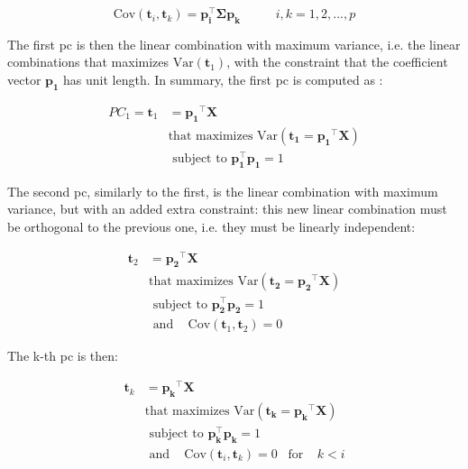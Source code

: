 \begin{equation}
	\label{eqn:pca-cov}
	\text{Cov}(\mathbf{t}_i, \mathbf{t}_k) = \mathbf{p_i^\intercal \Sigma p_k}\;\;\;\;\;\;\;\;\;\; i,k= 1, 2, ..., p
\end{equation}

The first \acrfull{pc} is then the linear combination with maximum variance, i.e. the linear combinations that maximizes $\text{Var}(\mathbf{t}_1)$, with the constraint that the coefficient vector $\mathbf{p_1}$ has unit length. In summary, the first \acrshort{pc} is computed as \parencite{johnson2013applied}:

\begin{equation}
	\label{eqn:pca-pc1}
	\begin{split}
		PC_1  = \mathbf{t}_1 & =\mathbf{p_1}^\intercal \mathbf{X}\\
			   & \text{that maximizes Var}(\mathbf{t_1}=\mathbf{p_1}^\intercal \mathbf{X}) \\
			   & \text{ subject to }  \mathbf{p_1^\intercal p_1} = 1
	\end{split}
\end{equation}

The second \acrshort{pc}, similarly to the first, is the linear combination with maximum variance, but with an added extra constraint: this new linear combination must be orthogonal to the previous one, i.e. they must be linearly independent:

\begin{equation}
	\label{eqn:pca-pc2}
	\begin{split}
		\mathbf{t}_2 & =\mathbf{p_2}^\intercal \mathbf{X}\\
		& \text{that maximizes Var}(\mathbf{t_2}=\mathbf{p_2}^\intercal \mathbf{X}) \\
		& \text{ subject to }  \mathbf{p_2^\intercal p_2} = 1\\
		& \text{ and } \;\;\; \text{Cov}(\mathbf{t}_1, \mathbf{t}_2) = 0
	\end{split}
\end{equation}

The k-th \acrshort{pc} is then:

\begin{equation}
	\label{eqn:pca-pck}
	\begin{split}
		\mathbf{t}_k & =\mathbf{p_k}^\intercal \mathbf{X}\\
		& \text{that maximizes Var}(\mathbf{t_k}=\mathbf{p_k}^\intercal \mathbf{X}) \\
		& \text{ subject to }  \mathbf{p_k^\intercal p_k} = 1\\
		& \text{ and } \;\;\; \text{Cov}(\mathbf{t}_i, \mathbf{t}_k) = 0 \;\;\; \text{for} \;\;\;\; k<i
	\end{split}
\end{equation}

